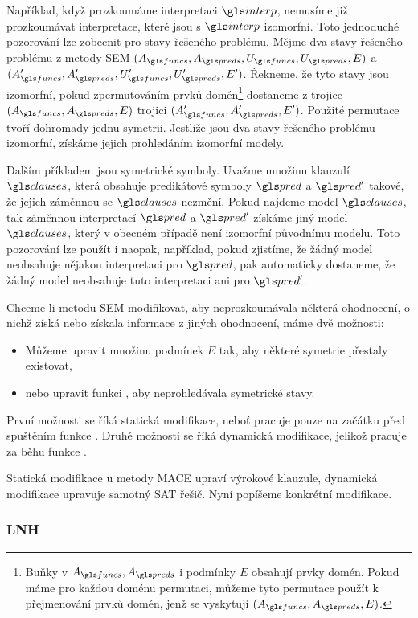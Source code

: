 Například, když prozkoumáme interpretaci $\interp$,
nemusíme již prozkoumávat interpretace, které jsou s $\interp$ izomorfní.
Toto jednoduché pozorování lze zobecnit pro stavy řešeného
problému.
Mějme dva stavy řešeného problému z metody SEM
$(A_\funcs, A_\preds, U_\funcs, U_\preds, E)$
a $(A_\funcs', A_\preds', U_\funcs', U_\preds', E')$.
Řekneme, že tyto stavy jsou izomorfní,
pokud zpermutováním prvků domén\footnote{Buňky v $A_\funcs, A_\preds$
i podmínky $E$ obsahují prvky domén.
Pokud máme pro každou doménu permutaci,
můžeme tyto permutace použít k přejmenování prvků domén,
jenž se vyskytují $(A_\funcs, A_\preds, E)$.}
dostaneme z trojice $(A_\funcs, A_\preds, E)$
trojici $(A_\funcs', A_\preds', E')$.
Použité permutace tvoří dohromady jednu symetrii.
Jestliže jsou dva stavy řešeného problému izomorfní,
získáme jejich prohledáním izomorfní modely.


Dalším příkladem jsou symetrické symboly. Uvažme
množinu klauzulí $\clauses$, která obsahuje
predikátové symboly $\pred$ a $\pred'$ takové,
že jejich záměnnou se $\clauses$ nezmění.
Pokud najdeme model $\clauses$, tak záměnnou interpretací
$\pred$ a $\pred'$ získáme jiný model $\clauses$, který
v obecném případě není izomorfní původnímu modelu.
Toto pozorování lze použít i naopak, například,
pokud zjistíme, že žádný model neobsahuje nějakou interpretaci pro $\pred$,
pak automaticky dostaneme, že žádný model neobsahuje tuto interpretaci
ani pro $\pred'$.

Chceme-li metodu SEM modifikovat, aby neprozkoumávala některá
ohodnocení, o nichž získá nebo získala informace
z jiných ohodnocení, máme dvě možnosti:
\begin{itemize}
\item Můžeme upravit množinu podmínek $E$ tak,
  aby některé symetrie přestaly existovat,
\item nebo upravit funkci , aby
  neprohledávala symetrické stavy.
\end{itemize}
První možnosti se říká statická modifikace, neboť
pracuje pouze na začátku před spuštěním funkce .
Druhé možnosti se říká dynamická modifikace,
jelikož pracuje za běhu funkce .

Statická modifikace u metody MACE upraví výrokové klauzule,
dynamická modifikace upravuje samotný SAT řešič.
Nyní popíšeme konkrétní modifikace.

\subsubsection{LNH}

